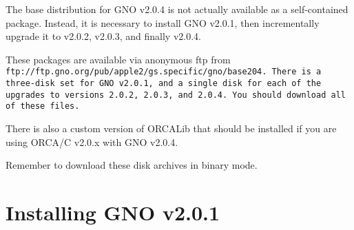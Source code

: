 \documentclass{report}
\begin{document}
The base distribution for GNO v2.0.4 is not actually available as a 
self-contained package.  Instead, it is necessary to install GNO
v2.0.1, then incrementally upgrade it to v2.0.2, v2.0.3, and finally
v2.0.4.

These packages are available via anonymous ftp from 
\tt ftp://ftp.gno.org/pub/apple2/gs.specific/gno/base204\rm.
There is a three-disk set for GNO v2.0.1, and a 
single disk for each of the upgrades to versions 2.0.2, 2.0.3, and 2.0.4.
You should download all of these files.

There is also a custom version of ORCALib that should be installed if you
are using ORCA/C v2.0.x with GNO v2.0.4.

Remember to download these disk archives in binary mode.

\section{Installing GNO v2.0.1}
\end{document}
